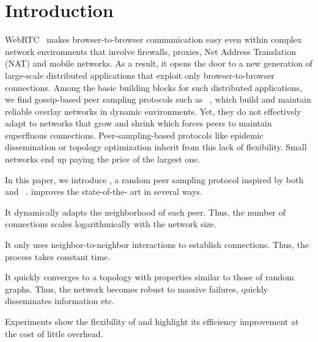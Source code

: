 
\section{Introduction}


WebRTC~\cite{webrtc} makes browser-to-browser communication easy even within
complex network environments that involve firewalls, proxies, Net Address
Translation (NAT) and mobile networks. As a result, it opens the door to a new
generation of large-scale distributed applications that exploit only
browser-to-browser connections. Among the basic building blocks for such
distributed applications, we find gossip-based peer sampling protocols such as
\CYCLON~\cite{voulgaris2005cyclon}, which build and maintain reliable overlay
networks in dynamic environments.  Yet, they do not effectively adapt to
networks that grow and shrink which forces peers to maintain superfluous
connections. Peer-sampling-based protocols like epidemic dissemination or
topology optimization inherit from this lack of flexibility. Small networks end
up paying the price of the largest one.

In this paper, we introduce \SPRAY, a random peer sampling protocol
inspired by both \SCAMP~\cite{ganesh2003peer} and
\CYCLON~\cite{voulgaris2005cyclon}. \SPRAY improves the state-of-the-
art in several ways. 
\begin{inparaenum}[(i)]
\item It dynamically adapts the neighborhood of each peer. Thus, the
  number of connections scales logarithmically with the network size.
\item It only uses neighbor-to-neighbor interactions to establish
  connections. Thus, the process takes constant time.
\item It quickly converges to a topology with properties similar to
  those of random graphs. Thus, the network becomes robust to massive
  failures, quickly disseminates information etc.
\item Experiments show the flexibility of \SPRAY and highlight its
  efficiency improvement at the cost of little overhead.
\end{inparaenum}

